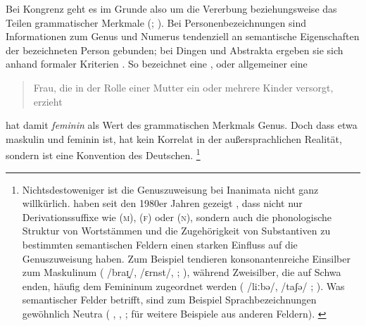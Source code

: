 Bei Kongrenz geht es im Grunde also um die Vererbung beziehungsweise das Teilen
grammatischer Merkmale (; \cite{corbett2012}). Bei
Personenbezeichnungen sind Informationen zum Genus und Numerus tendenziell an
semantische Eigenschaften der bezeichneten Person gebunden; bei Dingen und
Abstrakta ergeben sie sich anhand formaler Kriterien \autocites[vgl.][2--4,
125--132]{corbett2006}{koepckezubin2017}. So bezeichnet  eine
, oder allgemeiner
eine \blockcquote[s.\,v.~]{duden-online}{Frau, die in der Rolle
einer Mutter ein oder mehrere Kinder versorgt, erzieht}.  hat damit
\emph{feminin} als Wert des grammatischen Merkmals Genus. Doch dass etwa
 maskulin und  feminin ist, hat kein Korrelat in der
außersprachlichen Realität, sondern ist eine Konvention des
Deutschen.%
%
	\footnote{Nichtsdestoweniger ist die Genuszuweisung bei Inanimata nicht
		ganz willkürlich. \citeauthor{koepckezubin2017} haben seit den 1980er
		Jahren gezeigt
		\autocites[z.\,B.][]%
			{koepcke1982}%
			{koepckezubin1996}%
			{koepckezubin2009}%
			{koepckezubin2017},
		dass nicht nur Derivationssuffixe wie
			 (\textsc{m}),
			 (\textsc{f}) oder
			 (\textsc{n}),
		sondern auch die phonologische Struktur von Wortstämmen und die
		Zugehörigkeit von Substantiven zu bestimmten semantischen Feldern einen
		starken Einfluss auf die Genuszuweisung haben. Zum Beispiel tendieren
		konsonantenreiche Einsilber zum Maskulinum (%
			 /braɪ̯/,
			/ɛrnst/,
			;
		\cite[vgl.][475--479]{koepckezubin1996}), während Zweisilber, die auf
		Schwa enden, häufig dem Femininum zugeordnet werden (%
			 /liːbə/,
			/taʃə/%
			;
		\cite[vgl.][207--209]{koepckezubin2017}). Was semantischer Felder
		betrifft, sind zum Beispiel Sprachbezeichnungen gewöhnlich Neutra (%
			,
			,
			;
		\cites[siehe]%
			[480]{koepckezubin1996}%
			[137--139]{koepckezubin2009}%
			[210--214]{koepckezubin2017}
		für weitere Beispiele aus anderen Feldern).%
		\label{fn:koepckezubin}
	}

